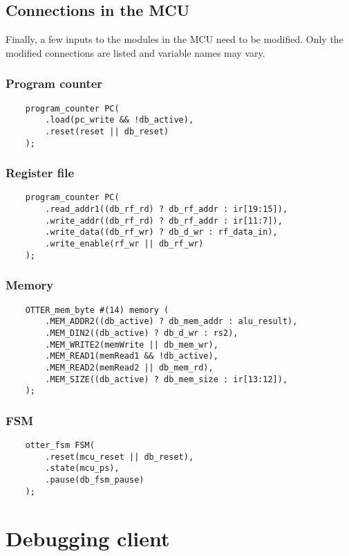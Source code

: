 \documentclass[10pt,a4paper]{article}
\begin{document}
\subsection{Connections in the MCU}
Finally, a few inputs to the modules in the MCU need to be modified. Only the modified connections
are listed and variable names may vary.

\subsubsection{Program counter}
\begin{verbatim}
    program_counter PC(
        .load(pc_write && !db_active),
        .reset(reset || db_reset)
    );
\end{verbatim}

\subsubsection{Register file}
\begin{verbatim}
    program_counter PC(
        .read_addr1((db_rf_rd) ? db_rf_addr : ir[19:15]),
        .write_addr((db_rf_rd) ? db_rf_addr : ir[11:7]),
        .write_data((db_rf_wr) ? db_d_wr : rf_data_in),
        .write_enable(rf_wr || db_rf_wr)
    );
\end{verbatim}

\newpage
\subsubsection{Memory}
\begin{verbatim}
    OTTER_mem_byte #(14) memory (
        .MEM_ADDR2((db_active) ? db_mem_addr : alu_result),
        .MEM_DIN2((db_active) ? db_d_wr : rs2),
        .MEM_WRITE2(memWrite || db_mem_wr),
        .MEM_READ1(memRead1 && !db_active),
        .MEM_READ2(memRead2 || db_mem_rd),
        .MEM_SIZE((db_active) ? db_mem_size : ir[13:12]),
    );
\end{verbatim}

\subsubsection{FSM}
\begin{verbatim}
    otter_fsm FSM(
        .reset(mcu_reset || db_reset),
        .state(mcu_ps),
        .pause(db_fsm_pause)
    );
\end{verbatim}

\section{Debugging client}
\end{document}
